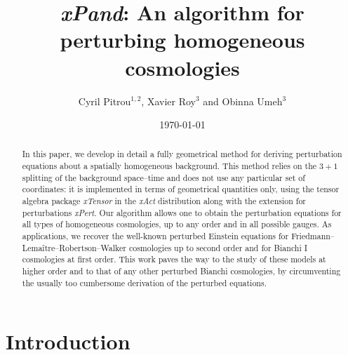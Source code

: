 \documentclass[notitlepage,onecolumn,floatfix,preprintnumbers,aps,prd,showpacs,nofootinbib,amsmath,amssymb,amsfonts]{revtex4-1}
\newcommand{\<}{\langle}
\renewcommand{\>}{\rangle}
\begin{document}
\title{\textit{xPand}: An algorithm for perturbing homogeneous cosmologies}

\author{Cyril Pitrou$^{1, 2}$, Xavier Roy$^3$ and Obinna Umeh$^3$}



\begin{abstract}

In this paper, we develop in detail a fully geometrical method for deriving perturbation equations 
about a spatially homogeneous background. This method relies on the $3+1$ splitting of the background space--time 
and does not use any particular set of coordinates: it is implemented in terms of geometrical quantities only, 
using the tensor algebra package \textit{xTensor} in the \textit{xAct} distribution along with the extension for perturbations \textit{xPert}. 
Our algorithm allows one to obtain the perturbation equations for all types of homogeneous cosmologies, 
up to any order and in all possible gauges. As applications, we recover the well-known perturbed Einstein equations 
for Friedmann--Lema\^itre--Robertson--Walker cosmologies up to second order and for Bianchi I cosmologies at first order. 
This work paves the way to the study of these models at higher order and to that of any other perturbed Bianchi cosmologies, 
by circumventing the usually too cumbersome derivation of the perturbed equations.

\end{abstract}

\date{\today}

\maketitle


\vspace{-7mm}

\section*{Introduction}
\end{document}
